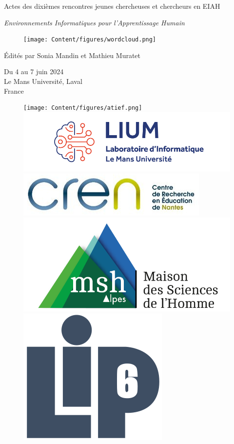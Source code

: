 \thispagestyle{empty}

\logoConf[0.7]
\vspace*{2em}
\begin{center}
	\Huge{Actes des dixièmes rencontres jeunes chercheuses et chercheurs en EIAH}
	\vspace{0.4em}
	
	\Large{\textit{Environnements Informatiques pour l'Apprentissage Humain}}
\end{center}

\begin{figure}[!ht]
	\centering
		\texttt{[image: Content/figures/wordcloud.png]}
\end{figure}

\begin{center}
	\begin{Large}
		Édités par Sonia Mandin et Mathieu Muratet
	\end{Large}

	\begin{large}
		Du 4 au 7 juin 2024\\
		Le Mans Université, Laval\\
		France
	\end{large}
\end{center}

\vspace*{\fill}

\begin{figure}[!ht]
	\centering
	\texttt{[image: Content/figures/atief.png]}\hfill
	\includegraphics[width=.3\textwidth,valign=m]{Content/figures/lium_logo.png}\hfill
	\includegraphics[width=.22\textwidth,valign=m]{Content/figures/cren_logo.jpg}\hfill
	\includegraphics[width=.18\textwidth,valign=m]{Content/figures/logo_msh.png}\hfill
	\includegraphics[width=.08\textwidth,valign=m]{Content/figures/logo_LIP6.png}\hfill
\end{figure}

